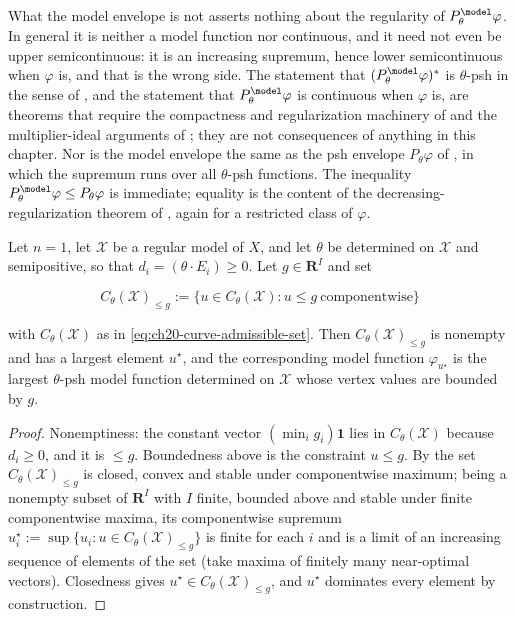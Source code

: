\begin{warning}{What the model envelope is not}
 asserts nothing about the regularity of
\(P^{\model}_\theta\varphi\).  In general it is neither a model function nor
continuous, and it need not even be upper semicontinuous: it is an
increasing supremum, hence lower semicontinuous when \(\varphi\) is, and
that is the wrong side.  The statement that
\((P^{\model}_\theta\varphi)^*\) is \(\theta\)-psh in the sense of
, and the statement that
\(P^{\model}_\theta\varphi\) is continuous when \(\varphi\) is, are theorems
that require the compactness and regularization machinery of
 and the multiplier-ideal arguments of
; they are not consequences of anything in this
chapter.  Nor is the model envelope the same as the psh envelope
\(P_\theta\varphi\) of , in which the supremum runs
over all \(\theta\)-psh functions.  The inequality
\(P^{\model}_\theta\varphi\leq P_\theta\varphi\) is immediate; equality is
the content of the decreasing-regularization theorem of
, again for a restricted class of \(\varphi\).
\end{warning}

\begin{proposition}
\label{prop:ch20-curve-envelope}
Let \(n=1\), let \(\mathcal X\) be a regular model of \(X\), and let
\(\theta\) be determined on \(\mathcal X\) and semipositive, so that
\(d_i=(\theta\cdot E_i)\geq0\).  Let \(g\in\mathbf R^I\) and set

\[
 C_\theta(\mathcal X)_{\le g}
 :=\{u\in C_\theta(\mathcal X):u\leq g\ \text{componentwise}\}
\]

with \(C_\theta(\mathcal X)\) as in
\eqref{eq:ch20-curve-admissible-set}.  Then
\(C_\theta(\mathcal X)_{\le g}\) is nonempty and has a largest element
\(u^\star\), and the corresponding model function
\(\varphi_{u^\star}\) is the largest \(\theta\)-psh model function
determined on \(\mathcal X\) whose vertex values are bounded by \(g\).
\end{proposition}

\begin{proof}
Nonemptiness: the constant vector \((\min_ig_i)\mathbf 1\) lies in
\(C_\theta(\mathcal X)\) because \(d_i\geq0\), and it is \(\leq g\).
Boundedness above is the constraint \(u\leq g\).  By
 the set \(C_\theta(\mathcal X)_{\le g}\) is
closed, convex and stable under componentwise maximum; being a nonempty
subset of \(\mathbf R^I\) with \(I\) finite, bounded above and stable under
finite componentwise maxima, its componentwise supremum
\(u^\star_i:=\sup\{u_i:u\in C_\theta(\mathcal X)_{\le g}\}\) is finite for
each \(i\) and is a limit of an increasing sequence of elements of the set
(take maxima of finitely many near-optimal vectors).  Closedness gives
\(u^\star\in C_\theta(\mathcal X)_{\le g}\), and \(u^\star\) dominates every
element by construction.
\end{proof}

